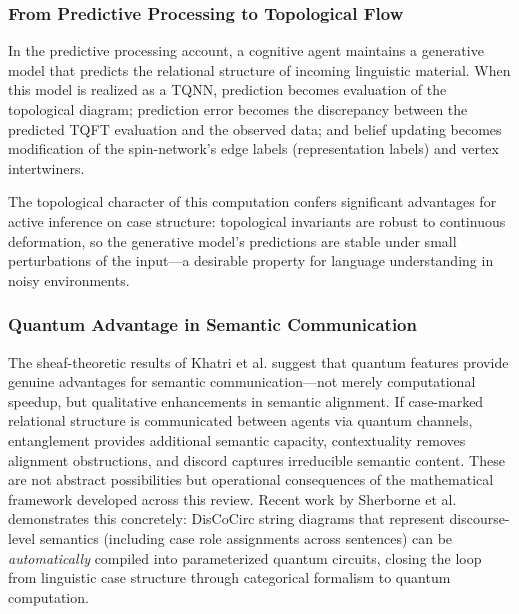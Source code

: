 \documentclass[
]{article}
\numberwithin{equation}{section}
\begin{document}
\subsubsection{From Predictive Processing to Topological
Flow}\label{from-predictive-processing-to-topological-flow}

In the predictive processing account, a cognitive agent maintains a
generative model that predicts the relational structure of incoming
linguistic material. When this model is realized as a TQNN, prediction
becomes evaluation of the topological diagram; prediction error becomes
the discrepancy between the predicted TQFT evaluation and the observed
data; and belief updating becomes modification of the spin-network's
edge labels (representation labels) and vertex intertwiners.

The topological character of this computation confers significant
advantages for active inference on case structure: topological
invariants are robust to continuous deformation, so the generative
model's predictions are stable under small perturbations of the
input---a desirable property for language understanding in noisy
environments.

\subsubsection{Quantum Advantage in Semantic
Communication}\label{quantum-advantage-in-semantic-communication}

The sheaf-theoretic results of Khatri et al.
\citeyearpar{khatri2025quantum} suggest that quantum features provide
genuine advantages for semantic communication---not merely computational
speedup, but qualitative enhancements in semantic alignment. If
case-marked relational structure is communicated between agents via
quantum channels, entanglement provides additional semantic capacity,
contextuality removes alignment obstructions, and discord captures
irreducible semantic content. These are not abstract possibilities but
operational consequences of the mathematical framework developed across
this review. Recent work by Sherborne et al.
\citeyearpar{sherborne2025paramqnlp} demonstrates this concretely:
DisCoCirc string diagrams that represent discourse-level semantics
(including case role assignments across sentences) can be
\emph{automatically} compiled into parameterized quantum circuits,
closing the loop from linguistic case structure through categorical
formalism to quantum computation.

\newpage
\end{document}
